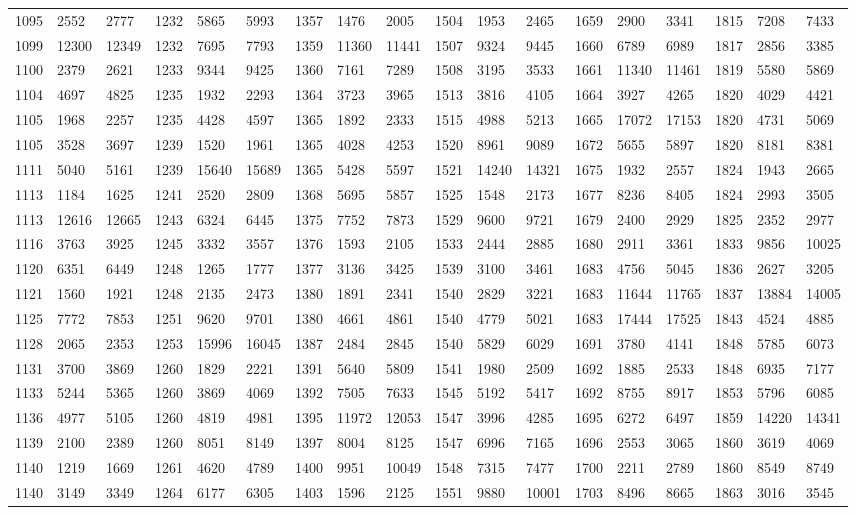 \begin{center}
\begin{longtable}{*5{A@{\hspace*{5mm}}A}}
1095&2552&2777&1232&5865&5993&1357&1476&2005&1504&1953&2465&1659&2900&3341&1815&7208&7433\\
1099&12300&12349&1232&7695&7793&1359&11360&11441&1507&9324&9445&1660&6789&6989&1817&2856&3385\\
1100&2379&2621&1233&9344&9425&1360&7161&7289&1508&3195&3533&1661&11340&11461&1819&5580&5869\\
1104&4697&4825&1235&1932&2293&1364&3723&3965&1513&3816&4105&1664&3927&4265&1820&4029&4421\\
1105&1968&2257&1235&4428&4597&1365&1892&2333&1515&4988&5213&1665&17072&17153&1820&4731&5069\\
1105&3528&3697&1239&1520&1961&1365&4028&4253&1520&8961&9089&1672&5655&5897&1820&8181&8381\\
1111&5040&5161&1239&15640&15689&1365&5428&5597&1521&14240&14321&1675&1932&2557&1824&1943&2665\\
1113&1184&1625&1241&2520&2809&1368&5695&5857&1525&1548&2173&1677&8236&8405&1824&2993&3505\\
1113&12616&12665&1243&6324&6445&1375&7752&7873&1529&9600&9721&1679&2400&2929&1825&2352&2977\\
1116&3763&3925&1245&3332&3557&1376&1593&2105&1533&2444&2885&1680&2911&3361&1833&9856&10025\\
1120&6351&6449&1248&1265&1777&1377&3136&3425&1539&3100&3461&1683&4756&5045&1836&2627&3205\\
1121&1560&1921&1248&2135&2473&1380&1891&2341&1540&2829&3221&1683&11644&11765&1837&13884&14005\\
1125&7772&7853&1251&9620&9701&1380&4661&4861&1540&4779&5021&1683&17444&17525&1843&4524&4885\\
1128&2065&2353&1253&15996&16045&1387&2484&2845&1540&5829&6029&1691&3780&4141&1848&5785&6073\\
1131&3700&3869&1260&1829&2221&1391&5640&5809&1541&1980&2509&1692&1885&2533&1848&6935&7177\\
1133&5244&5365&1260&3869&4069&1392&7505&7633&1545&5192&5417&1692&8755&8917&1853&5796&6085\\
1136&4977&5105&1260&4819&4981&1395&11972&12053&1547&3996&4285&1695&6272&6497&1859&14220&14341\\
1139&2100&2389&1260&8051&8149&1397&8004&8125&1547&6996&7165&1696&2553&3065&1860&3619&4069\\
1140&1219&1669&1261&4620&4789&1400&9951&10049&1548&7315&7477&1700&2211&2789&1860&8549&8749\\
1140&3149&3349&1264&6177&6305&1403&1596&2125&1551&9880&10001&1703&8496&8665&1863&3016&3545\\

\end{longtable}
\end{center}
